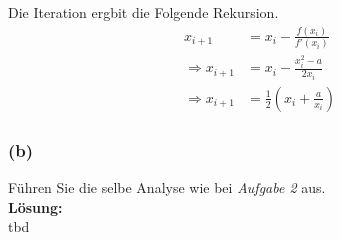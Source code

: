 \documentclass[11pt,a4paper,ngerman]{article}
\begin{document}
Die Iteration ergbit die Folgende Rekursion.
\begin{equation}\begin{split}
    x_{i+1} &= x_i - \frac{f(x_i)}{f'(x_i)}\\
    \Rightarrow x_{i+1} &= x_i - \frac{x_i^2 - a}{2x_i}\\
    \Rightarrow x_{i+1} &= \frac{1}{2} (x_i + \frac{a}{x_i})
\end{split}\end{equation}

\subsubsection*{(b)}

Führen Sie die selbe Analyse wie bei \emph{Aufgabe 2} aus.\\

\textbf{Lösung:}\\

tbd

\label{LastPage}
\end{document}
